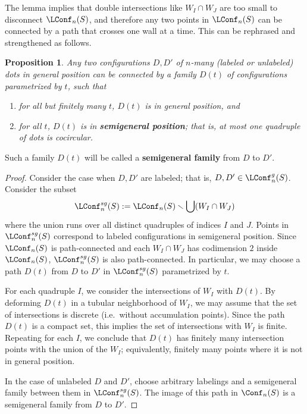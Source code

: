 \documentclass[11pt,oneside]{amsart}
\newtheorem{prop}[thm]{Proposition}
\theoremstyle{definition}
\theoremstyle{remark}
\numberwithin{equation}{section}
\begin{document}
The lemma implies that double intersections like $W_I\cap W_J$ are too small to disconnect $\LConf_n(S)$, and therefore any two points in $\LConf_n(S)$ can be connected by a path that crosses one wall at a time. This can be rephrased and strengthened as follows.


\begin{prop}\label{prop: semigeneral}
Any two configurations $D,D'$ of $n$-many (labeled or unlabeled) dots in general position can be connected by a family $D(t)$ of configurations parametrized by $t$, such that
\begin{enumerate}
    \item for all but finitely many $t$, $D(t)$ is in general position, and
    \item for all $t$, $D(t)$ is in \textbf{semigeneral position}; that is, at most one quadruple of dots is cocircular.
\end{enumerate}
\end{prop}

Such a family $D(t)$ will be called a \textbf{semigeneral family} from $D$ to $D'$. %

\begin{proof}
Consider the case when $D,D'$ are labeled; that is, $D,D'\in \LConf_n^g(S)$.
%
Consider the subset
\[ \LConf_n^{sg}(S) : = \LConf_n(S) \smallsetminus \bigcup (W_I\cap W_J) \]
where the union runs over all distinct quadruples of indices $I$ and $J$. Points in $\LConf_n^{sg}(S)$ correspond to labeled configurations in semigeneral position.
Since $\LConf_n(S)$ is path-connected and each $W_I\cap W_J$ has codimension $2$ inside $\LConf_n(S)$, $\LConf_n^{sg}(S)$ is also path-connected. In particular, we may choose a path ${D}(t)$ from ${D}$ to ${D}'$ in $\LConf_n^{sg}(S)$ parametrized by $t$. 

For each quadruple $I$, we consider the intersections of $W_I$ with ${D}(t)$. By deforming ${D}(t)$ in a tubular neighborhood of $W_I$, we may assume that the set of intersections is discrete (i.e.~without accumulation points). Since the path ${D}(t)$ is a compact set, this implies the set of intersections with $W_I$ is finite. Repeating for each $I$, we conclude that ${D}(t)$ has finitely many intersection points with the union of the $W_I$; equivalently, finitely many points where it is not in general position.

In the case of unlabeled $D$ and $D'$, choose arbitrary labelings and a semigeneral family between them in $\LConf_n^{sg}(S)$. The image of this path in $\Conf_n(S)$ is a semigeneral family from $D$ to $D'$.
%
\end{proof}
\end{document}
